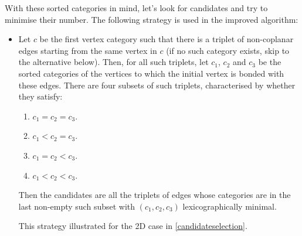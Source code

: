 \documentclass[main.tex]{subfiles}
\begin{document}
With these sorted categories in mind, let's look for candidates and try to minimise their number. The following strategy is used in the improved algorithm:
\begin{itemize}[noitemsep]
	\item Let $c$ be the first vertex category such that there is a triplet of non-coplanar edges starting from the same vertex in $c$ (if no such category exists, skip to the alternative below). Then, for all such triplets, let $c_1$, $c_2$ and $c_3$ be the sorted categories of the vertices to which the initial vertex is bonded with these edges. There are four subsets of such triplets, characterised by whether they satisfy:
	\begin{enumerate}[noitemsep]
		\item $c_1 = c_2 = c_3$.
		\item $c_1 < c_2 = c_3$.
		\item $c_1 = c_2 < c_3$.
		\item $c_1 < c_2 < c_3$.
	\end{enumerate}
	Then the candidates are all the triplets of edges whose categories are in the last non-empty such subset with $(c_1,c_2,c_3)$ lexicographically minimal.
	
	This strategy illustrated for the 2D case in \cref{candidateselection}.
	

\end{itemize}
\end{document}
